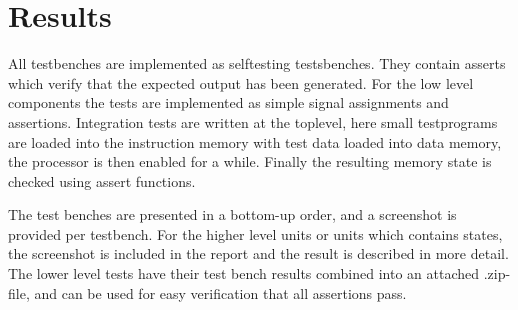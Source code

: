 \section{Results}

All testbenches are implemented as selftesting testsbenches. They contain 
asserts which verify that the expected output has been generated. For the 
low level components the tests are implemented as simple signal assignments 
and assertions. Integration tests are written at the toplevel, here small 
testprograms are loaded into the instruction memory with test data loaded
into data memory, the processor is then enabled for a while. Finally the 
resulting memory state is checked using assert functions.

The test benches are presented in a bottom-up order, and a screenshot is 
provided per testbench. For the higher level 
units or units which contains states, the screenshot is included in the report
and the result is described in more detail. The lower level tests have their test bench results combined into an attached .zip-file, and can be used for easy verification that all assertions pass.






\FloatBarrier
